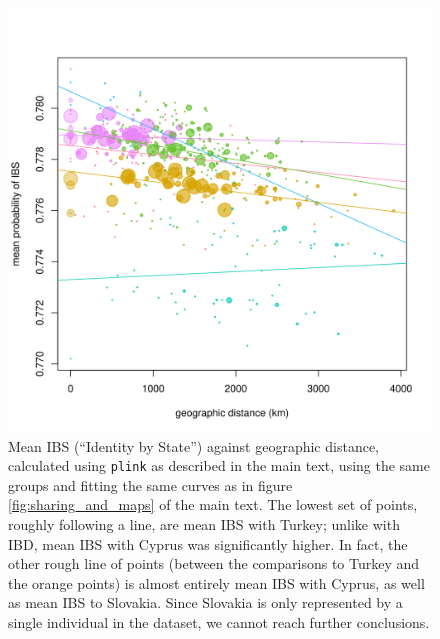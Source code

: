 \documentclass{article}
\begin{document}
\begin{figure}[!htp]
  \begin{center}
    \includegraphics{IBS_vs_dist}
    \caption{
    Mean IBS (``Identity by State'') against geographic distance,
    calculated using {\tt plink} \citep{purcell2007plink} as described in the main text,
    using the same groups and fitting the same curves as in figure \ref{fig:sharing_and_maps} of the main text.
    The lowest set of points, roughly following a line, are mean IBS with Turkey;
    unlike with IBD, mean IBS with Cyprus was significantly higher.
    In fact, the other rough line of points (between the comparisons to Turkey and the orange points)
    is almost entirely mean IBS with Cyprus, as well as mean IBS to Slovakia.
    Since Slovakia is only represented by a single individual in the dataset, we cannot reach further conclusions.
    \label{sfig:ibs_by_dist}
    }
  \end{center}
\end{figure}
\end{document}
